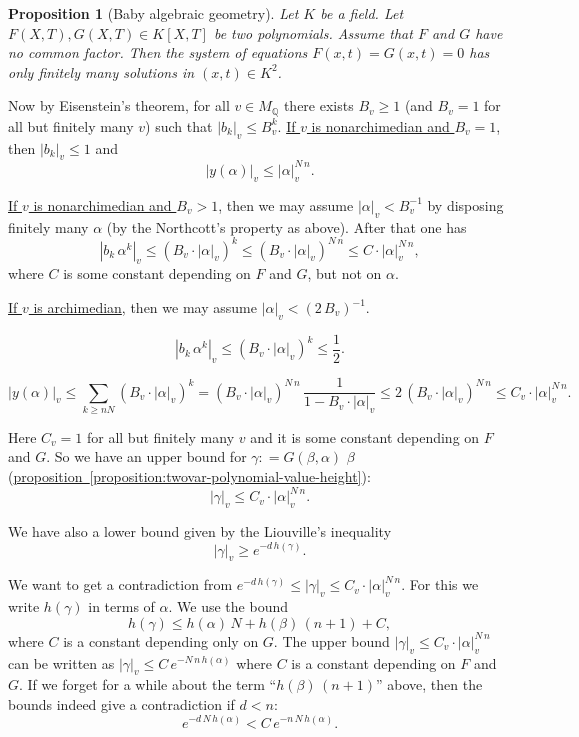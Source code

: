 \documentclass{article}
\newcommand{\dfn}{\mathrel{\mathop:}=}
\newcommand{\QQ}{\mathbb{Q}}
\newcommand{\refref}[2]{\hyperref[#2]{#1~\ref*{#2}}}
\theoremstyle{myplain}
\newtheorem{proposition}{Proposition}[section]
\theoremstyle{mydefinition}
\begin{document}
\begin{proposition}[Baby algebraic geometry]
  Let $K$ be a field. Let $F (X,T), G (X,T) \in K [X,T]$ be two
  polynomials. Assume that $F$ and $G$ have no common factor. Then the system of
  equations $F (x,t) = G (x,t) = 0$ has only finitely many solutions in
  $(x,t) \in K^2$.
\end{proposition}

Now by Eisenstein's theorem, for all $v \in M_\QQ$ there exists $B_v \ge 1$ (and
$B_v = 1$ for all but finitely many $v$) such that $|b_k|_v \le
B_v^k$. \underline{If $v$ is nonarchimedian and $B_v = 1$}, then $|b_k|_v \le 1$
and
$$|y (\alpha)|_v \le |\alpha|_v^{N\,n}.$$

\underline{If $v$ is nonarchimedian and $B_v > 1$}, then we may assume
$|\alpha|_v < B_v^{-1}$ by disposing finitely many $\alpha$ (by the Northcott's
property as above). After that one has
\[ |b_k \, \alpha^k|_v \le
  (B_v \cdot |\alpha|_v)^k \le
  (B_v \cdot |\alpha|_v)^{N\,n} \le
  C \cdot |\alpha|_v^{N\,n}, \]
where $C$ is some constant depending on $F$ and $G$, but not on $\alpha$.

\underline{If $v$ is archimedian}, then we may assume $|\alpha|_v < (2\,B_v)^{-1}$.

\[ |b_k \, \alpha^k|_v \le (B_v \cdot |\alpha|_v)^k \le \frac{1}{2}. \]

\[ |y (\alpha)|_v \le \sum_{k \ge n N} (B_v \cdot |\alpha|_v)^k =
  (B_v \cdot |\alpha|_v)^{N\,n} \, \frac{1}{1 - B_v \cdot |\alpha|_v} \le
  2 \, (B_v \cdot |\alpha|_v)^{N\,n} \le
  C_v \cdot |\alpha|_v^{N\,n}. \]

Here $C_v = 1$ for all but finitely many $v$ and it is some constant depending
on $F$ and $G$. So we have an upper bound for $\gamma \dfn G (\beta,\alpha)$
$\beta$ (\refref{proposition}{proposition:twovar-polynomial-value-height}):
\[ |\gamma|_v \le C_v \cdot |\alpha|_v^{N\,n}. \]

We have also a lower bound given by the Liouville's inequality
\[ |\gamma|_v \ge e^{-d \, h (\gamma)}. \]

We want to get a contradiction from
$e^{-d \, h (\gamma)} \le |\gamma|_v \le C_v \cdot |\alpha|_v^{N\,n}$. For this
we write $h (\gamma)$ in terms of $\alpha$. We use the bound
$$h (\gamma) \le h (\alpha) \, N + h (\beta) \, (n+1) + C,$$
where $C$ is a constant depending only on $G$. The upper bound
$|\gamma|_v \le C_v \cdot |\alpha|_v^{N\,n}$ can be written as
$|\gamma|_v \le C\, e^{-N\,n\,h(\alpha)}$ where $C$ is a constant depending on
$F$ and $G$. If we forget for a while about the term ``$h (\beta) \, (n+1)$''
above, then the bounds indeed give a contradiction if $d < n$:
$$e^{-d \, N \, h (\alpha)} < C \, e^{-n \, N \, h (\alpha)}.$$
\end{document}
